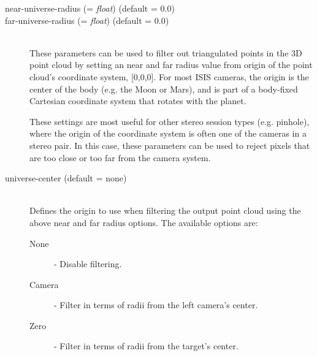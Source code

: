 \begin{description}
\item[near-universe-radius \textnormal{\small{(= \emph{float})}} (default = 0.0)]
\item[far-universe-radius \textnormal{\small{(= \emph{float})}} (default = 0.0)] \hfill \\
  These parameters can be used to filter out triangulated points in
  the 3D point cloud by setting an near and far radius value from
  origin of the point cloud's coordinate system, [0,0,0].  For most
  ISIS cameras, the origin is the center of the body (e.g. the Moon or
  Mars), and is part of a body-fixed Cartesian coordinate system that
  rotates with the planet.

  These settings are most useful for other stereo session types
  (e.g. pinhole), where the origin of the coordinate system is often
  one of the cameras in a stereo pair.  In this case, these parameters
  can be used to reject pixels that are too close or too far from the
  camera system.

\item[universe-center \textnormal (default = none)] \hfill \\
  Defines the origin to use when filtering the output point cloud
  using the above near and far radius options. The available options
  are:

  \begin{description}
    \item[None] - Disable filtering.
    \item[Camera] - Filter in terms of radii from the left camera's
      center.
    \item[Zero] - Filter in terms of radii from the target's center.
  \end{description}

\end{description}


